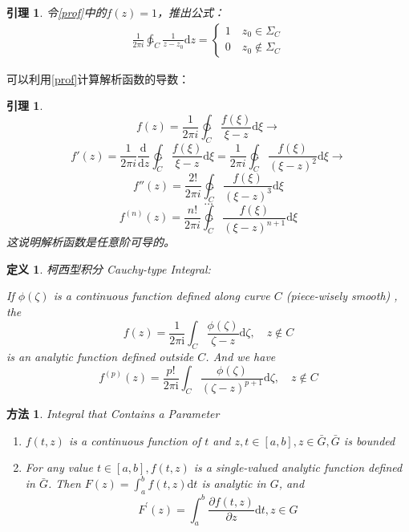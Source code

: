\documentclass[10pt, a4paper, oneside]{ctexbook}
\newtheorem{definition}[theorem]{定义}
\newtheorem{lemma}[theorem]{引理}
\newtheorem{method}[theorem]{方法}
\def\D{\mathrm{d}}
\newcommand{\F}[1][z]
{\ensuremath{f(#1)}}
\newcommand{\dev}[3][]
{\ensuremath{\frac{\displaystyle \D^{#1} #2}{ \displaystyle \D #3}}}
\begin{document}
\begin{lemma}
    令\ref{prof}中的$\F=1$，推出公式：
    \begin{align*}
        \frac{1}{2\pi i}\ointctrclockwise_C \frac{1}{z-z_0} \D z=
        \begin{cases}
            1\quad z_0\in \Sigma_C\\
            0\quad z_0\notin \Sigma_C
        \end{cases}
    \end{align*}
\end{lemma}
可以利用\ref{prof}计算解析函数的导数：
\begin{lemma}
    \label{method283}
    $$
    \F = \frac{1}{2\pi i}\ointctrclockwise_C \frac{\F[\xi]}{\xi-z}\D \xi \to
    $$
    $$
    f'(z)=\frac{1}{2\pi i} \dev{}{z}\ointctrclockwise_C \frac{\F[\xi]}{\xi - z}\D \xi= \frac{1}{2\pi i}\ointctrclockwise_C \frac{\F[\xi]}{(\xi-z)^2}\D \xi \to
    $$
    $$
    f''(z)=\frac{2!}{2\pi i}\ointctrclockwise_C \frac{\F[\xi]}{(\xi-z)^3}\D \xi 
    $$
    $$\dots$$
    $$
    f^{(n)}(z)=\frac{n!}{2\pi i}\ointctrclockwise_C \frac{\F[\xi]}{(\xi-z)^{n+1}}\D \xi
    $$
    这说明解析函数是任意阶可导的。
\end{lemma}
\begin{definition}
    柯西型积分 Cauchy-type Integral:
    \rm

    If $\phi(\zeta)$ is a continuous function defined along curve $C$ (piece-wisely smooth) , the 
    $$f(z)=\frac{1}{2 \pi \mathrm{i}} \int_{C} \frac{\phi(\zeta)}{\zeta-z} \D \zeta, \quad z \notin C $$ 
    is an analytic function defined outside $C$. And we have 
    $$f^{(p)}(z)=\frac{p !}{2 \pi \mathrm{i}} \int_{C} \frac{\phi(\zeta)}{(\zeta-z)^{p+1}} \D \zeta, \quad z \notin C$$
\end{definition}
\begin{method}
    Integral that Contains a Parameter
    \begin{enumerate}
        \rm
        \item $f(t, z)$ is a continuous function of $t$ and $z, t \in[a, b], z \in \bar{G}, \bar{G}$ is bounded
        \item  For any value $t \in[a, b], f(t, z)$ is a single-valued analytic function defined in $\bar{G}$.
        Then $\displaystyle F(z)=\int_{a}^{b} f(t, z) \D t$ is analytic in $G$, and
        $$F^{\prime}(z)=\int_{a}^{b} \frac{\partial f(t, z)}{\partial z} \D t, z \in G$$
    \end{enumerate}
\end{method}
\end{document}
